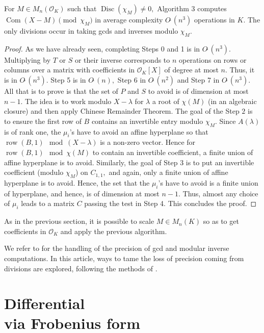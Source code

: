 \documentclass{sig-alternate-05-2015}
\DeclareMathOperator{\com}{Com}
\DeclareMathOperator{\disc}{Disc}
\DeclareMathOperator{\row}{row}
\newcommand{\OK}{\mathcal{O}_K}
\newcommand{\softO}{O\tilde{~}}
\begin{document}
\begin{theo}
\label{thm:alg3}
For $M \in M_n(\OK)$ such that $\disc( \chi_M) \neq 0,$
Algorithm 3 computes
$\com (X-M) \pmod{\chi_M}$ in average complexity $\softO (n^3)$
operations in $K$.
The only divisions occur in taking gcds and inverses modulo $\chi_M$.
\end{theo}
\begin{proof}
As we have already seen, completing Steps 0 and 1 is in $\softO (n^3).$
Multiplying by $T$ or $S$ or their inverse corresponds
to $n$ operations on rows or columns over a matrix with coefficients
in $\OK[X]$ of degree at most $n.$
Thus, it is in $\softO (n^3).$
Step 5 is in $\softO (n),$ Step 6 in $\softO(n^2)$ and Step 7 in $\softO(n^3)$.
All that is to prove is that the set of $P$ and $S$ to avoid
is of dimension at most $n-1.$
The idea is to work modulo $X-\lambda$
for $\lambda$ a root of $\chi (M)$ (in an algebraic closure)
and then apply Chinese Remainder Theorem.
The goal of the Step $2$ is to ensure the first row of $B$ contains an
invertible entry modulo $\chi_M.$
Since $A(\lambda)$ is of rank one, the $\mu_i$'s have to avoid an
affine hyperplane so that $\row(B,1) \mod (X-\lambda)$ is a non-zero vector.
Hence for $\row(B,1) \mod \chi (M)$ to contain an invertible coefficient,
a finite union of affine hyperplane is to avoid.
Similarly, the goal of Step 3 is to put an invertible coefficient (modulo
$\chi_M$) on $C_{1,1},$ and again, only a finite union of affine
hyperplane is to avoid.
Hence, the set that the $\mu_i$'s have to avoid is a finite union
of hyperplane, and hence, is of dimension at most $n-1.$
Thus, almost any choice of $\mu_i$ leads to a matrix $C$ passing the test
in Step 4.
This concludes the proof.
\end{proof}


\begin{rem}
As in the previous section, it is possible
to scale $M \in M_n(K)$ so as to
get coefficients in $\OK$ and apply the previous algorithm.
\end{rem}
\begin{rem}
We refer to \cite{caruso:15a} for the handling
of the precision of gcd and modular inverse computations.
In this article, ways to tame the loss of precision
coming from divisions are explored, following
the methods of \cite{caruso-roe-vaccon:14a}.
\end{rem}


\section{Differential\\via Frobenius form}
\label{sec:diffFrob}
\end{document}
